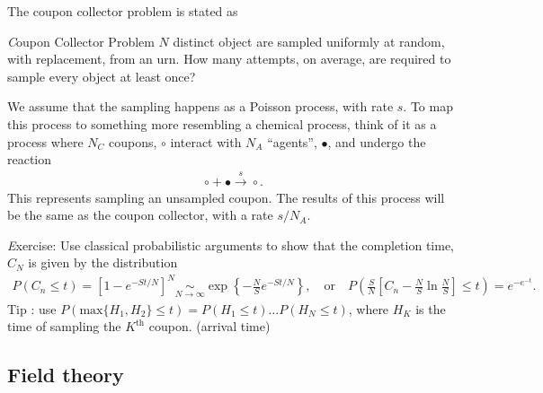 The coupon collector problem is stated as 
%
\begin{framed}\noindent
    {\textit Coupon Collector Problem} $N$ distinct object are sampled uniformly at random, with replacement, from an urn.
    How many attempts, on average, are required to sample every object at least once?
\end{framed}
%
We assume that the sampling happens as a Poisson process, with rate $s$.
To map this process to something more resembling a chemical process, think of it as a process where $N_C$ coupons, $\circ$ interact with $N_A$ ``agents'', $\bullet$, and undergo the reaction
%
\begin{align}
    \circ + \bullet \overset{s}{\longrightarrow} \circ.
\end{align}
%
This represents sampling an unsampled coupon.
The results of this process will be the same as the coupon collector, with a rate $s/N_A$.

\begin{framed}
    {\textit Exercise:}
    Use classical probabilistic arguments to show that the completion time, $C_N$ is given by the distribution
    \begin{align}
        P(C_n \leq t) = [1 - e^{-St/N}]^N \underset{N\rightarrow \infty}{\sim} \exp \left\{ - \frac{ N }{ S } e^{-St/N} \right\}, 
        \quad \text{or} \quad
        P\left(\frac{ S }{ N } \left[C_n - \frac{ N }{ S } \ln \frac{ N }{ S }\right] \leq t\right) = e^{-e^{-t}}.
    \end{align}
    Tip : use $P(\mathrm{max}\{H_1, H_2\} \leq t) = P(H_1\leq t) \dots P(H_N\leq t)$, where $H_K$ is the time of sampling the $K^\text{th}$ coupon. (arrival time)
\end{framed}


\subsection*{Field theory}

